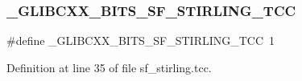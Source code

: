 \subsubsection{\texorpdfstring{\+\_\+\+G\+L\+I\+B\+C\+X\+X\+\_\+\+B\+I\+T\+S\+\_\+\+S\+F\+\_\+\+S\+T\+I\+R\+L\+I\+N\+G\+\_\+\+T\+CC}{\_GLIBCXX\_BITS\_SF\_STIRLING\_TCC}}
{\footnotesize\ttfamily \#define \+\_\+\+G\+L\+I\+B\+C\+X\+X\+\_\+\+B\+I\+T\+S\+\_\+\+S\+F\+\_\+\+S\+T\+I\+R\+L\+I\+N\+G\+\_\+\+T\+CC~1}



Definition at line 35 of file sf\+\_\+stirling.\+tcc.

